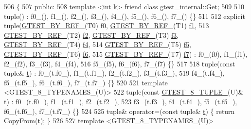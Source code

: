 \begin{DoxyCode}
506                         \{
507  \textcolor{keyword}{public}:
508   \textcolor{keyword}{template} <\textcolor{keywordtype}{int} k> \textcolor{keyword}{friend} \textcolor{keyword}{class }gtest\_internal::Get;
509 
510   tuple() : f0\_(), f1\_(), f2\_(), f3\_(), f4\_(), f5\_(), f6\_(), f7\_() \{\}
511 
512   \textcolor{keyword}{explicit} tuple(\hyperlink{gtest-tuple_8h_adcf9057737a411d833fac0382c13a181}{GTEST\_BY\_REF\_}(T0) f0, \hyperlink{gtest-tuple_8h_adcf9057737a411d833fac0382c13a181}{GTEST\_BY\_REF\_}(T1) 
      \hyperlink{namespacestd_1_1tr1_a9c0fa65b105f8e2f58ba59ecf75fd000}{f1},
513       \hyperlink{gtest-tuple_8h_adcf9057737a411d833fac0382c13a181}{GTEST\_BY\_REF\_}(T2) \hyperlink{namespacestd_1_1tr1_a87dd9e009868361317f587126dba63d4}{f2}, \hyperlink{gtest-tuple_8h_adcf9057737a411d833fac0382c13a181}{GTEST\_BY\_REF\_}(T3) \hyperlink{namespacestd_1_1tr1_a0f7c3b47d27d42d82d1a333ea420ce4e}{f3}, 
      \hyperlink{gtest-tuple_8h_adcf9057737a411d833fac0382c13a181}{GTEST\_BY\_REF\_}(T4) \hyperlink{namespacestd_1_1tr1_adc796e02b7385d526aff708189564f67}{f4},
514       \hyperlink{gtest-tuple_8h_adcf9057737a411d833fac0382c13a181}{GTEST\_BY\_REF\_}(T5) \hyperlink{namespacestd_1_1tr1_a9c1eb66b2b2fa321942af95405232a0d}{f5}, \hyperlink{gtest-tuple_8h_adcf9057737a411d833fac0382c13a181}{GTEST\_BY\_REF\_}(T6) \hyperlink{namespacestd_1_1tr1_a6b62f32e1e3e21bceb94eb46c4cbfd56}{f6},
515       \hyperlink{gtest-tuple_8h_adcf9057737a411d833fac0382c13a181}{GTEST\_BY\_REF\_}(T7) \hyperlink{namespacestd_1_1tr1_a2185f3a1c07f2df072c39cb91ffa89a4}{f7}) : f0\_(f0), f1\_(f1), f2\_(f2), f3\_(f3), f4\_(f4),
516       f5\_(f5), f6\_(f6), f7\_(f7) \{\}
517 
518   tuple(\textcolor{keyword}{const} tuple& \hyperlink{namespacebattery__monitor__node_a7a63d20d1ea461e280f4eb5b47f925cd}{t}) : f0\_(t.f0\_), f1\_(t.f1\_), f2\_(t.f2\_), f3\_(t.f3\_),
519       f4\_(t.f4\_), f5\_(t.f5\_), f6\_(t.f6\_), f7\_(t.f7\_) \{\}
520 
521   \textcolor{keyword}{template} <GTEST\_8\_TYPENAMES\_(U)>
522   tuple(\textcolor{keyword}{const} \hyperlink{gtest-tuple_8h_a2bc36d1a71a551e6cda2ac5504fb7ce3}{GTEST\_8\_TUPLE\_}(U)& \hyperlink{namespacebattery__monitor__node_a7a63d20d1ea461e280f4eb5b47f925cd}{t}) : f0\_(t.f0\_), f1\_(t.f1\_), f2\_(t.f2\_),
523       f3\_(t.f3\_), f4\_(t.f4\_), f5\_(t.f5\_), f6\_(t.f6\_), f7\_(t.f7\_) \{\}
524 
525   tuple& operator=(\textcolor{keyword}{const} tuple& \hyperlink{namespacebattery__monitor__node_a7a63d20d1ea461e280f4eb5b47f925cd}{t}) \{ \textcolor{keywordflow}{return} CopyFrom(t); \}
526 
527   \textcolor{keyword}{template} <GTEST\_8\_TYPENAMES\_(U)>

\end{DoxyCode}
